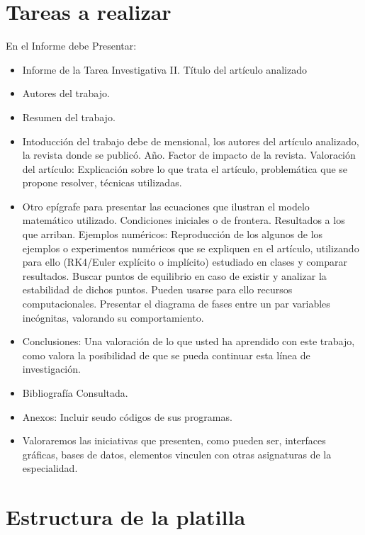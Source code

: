 \documentclass{wscpaperproc}
\theoremstyle{wsc}
\begin{document}
\maketitle
\section*{Tareas a realizar}
En el Informe debe Presentar:
\begin{itemize}
 \item Informe de la Tarea Investigativa II. T\'itulo del art\'iculo analizado
 \item Autores del trabajo.
 \item Resumen del trabajo.
 \item Intoducci\'on del trabajo debe de mensional, los autores del art\'iculo analizado, la revista donde se public\'o. A\~no. Factor de impacto de la revista. Valoraci\'on del art\'iculo: Explicaci\'on sobre lo que trata el art\'iculo, problem\'atica que se propone resolver, t\'ecnicas utilizadas.
 \item Otro ep\'igrafe para presentar las ecuaciones que ilustran el modelo matem\'atico utilizado. Condiciones iniciales o de frontera. Resultados a los que arriban. Ejemplos num\'ericos: Reproducci\'on de los algunos de los ejemplos o experimentos num\'ericos que se expliquen en el art\'iculo, utilizando para ello (RK4/Euler expl\'icito o impl\'icito) estudiado en clases y comparar resultados. Buscar puntos de equilibrio en caso de existir y analizar la estabilidad de dichos puntos. Pueden usarse para ello recursos computacionales. Presentar el diagrama de fases entre un par variables inc\'ognitas, valorando su comportamiento.
 \item Conclusiones: Una valoraci\'on de lo que usted ha aprendido con este trabajo, como valora la posibilidad de que se pueda continuar esta l\'inea de investigaci\'on.
 \item Bibliograf\'ia Consultada.
 \item  Anexos: Incluir seudo c\'odigos de sus programas.
 \item Valoraremos las iniciativas que presenten, como pueden ser, interfaces gr\'aficas, bases de datos, elementos  vinculen con otras asignaturas de la especialidad.
\end{itemize}

\section*{Estructura de la platilla}
\end{document}

